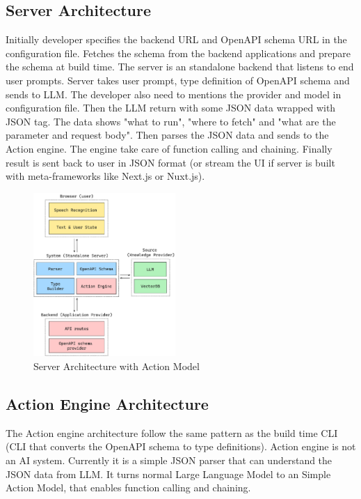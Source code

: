 \documentclass[conference]{IEEEtran}
\begin{document}
\subsection{Server Architecture}
Initially developer specifies the backend URL and OpenAPI schema URL in the configuration file. Fetches the schema from the backend applications and prepare the schema at build time. The server is an standalone backend that listens to end user prompts. Server takes user prompt, type definition of OpenAPI schema and sends to LLM. The developer also need to mentions the provider and model in configuration file. Then the LLM return with some JSON data wrapped with JSON tag. The data shows "what to run", "where to fetch" and "what are the parameter and request body". Then parses the JSON data and sends to the Action engine. The engine take care of function calling and chaining. Finally result is sent back to user in JSON format (or stream the UI if server is built with meta-frameworks like Next.js or Nuxt.js).

\begin{figure}[htbp]
    \centering
    \includegraphics[width=0.48\textwidth]{images/server.png}
    \caption{Server Architecture with Action Model}
    \label{fig}
\end{figure}


\subsection{Action Engine Architecture}
The Action engine architecture follow the same pattern as the build time CLI (CLI that converts the OpenAPI schema to type definitions). Action engine is not an AI system. Currently it is a simple JSON parser that can understand the JSON data from LLM. It turns normal Large Language Model to an Simple Action Model, that enables function calling and chaining. 
\end{document}
